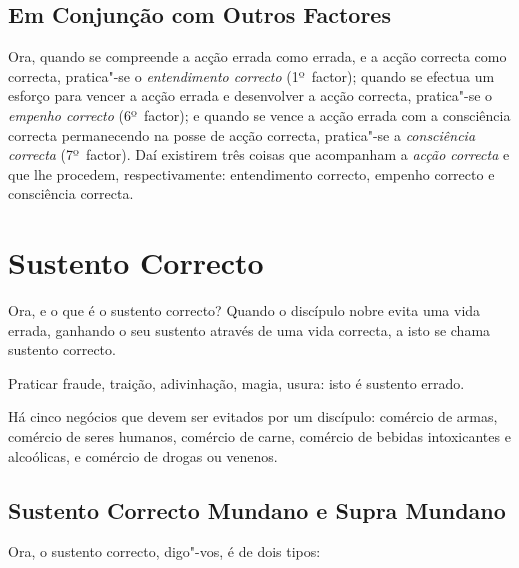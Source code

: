 \subsection{Em Conjunção com Outros Factores}

Ora, quando se compreende a acção errada como errada, e a acção correcta como
correcta, pratica"-se o \emph{entendimento correcto} (1º~factor); quando se
efectua um esforço para vencer a acção errada e desenvolver a acção correcta,
pratica"-se o \emph{empenho correcto} (6º~factor); e quando se vence a acção
errada com a consciência correcta permanecendo na posse de acção correcta,
pratica"-se a \emph{consciência correcta} (7º~factor). Daí existirem três coisas
que acompanham a \emph{acção correcta} e que lhe procedem, respectivamente:
entendimento correcto, empenho correcto e consciência correcta.


\section{Sustento Correcto}



Ora, e o que é o sustento correcto? Quando o discípulo nobre evita uma vida
errada, ganhando o seu sustento através de uma vida correcta, a isto se chama
sustento correcto.



Praticar fraude, traição, adivinhação, magia, usura: isto é sustento errado.



Há cinco negócios que devem ser evitados por um discípulo: comércio de armas,
comércio de seres humanos, comércio de carne, comércio de bebidas intoxicantes e
alcoólicas, e comércio de drogas ou venenos.


\subsection{Sustento Correcto Mundano e Supra Mundano}

Ora, o sustento correcto, digo"-vos, é de dois tipos:

